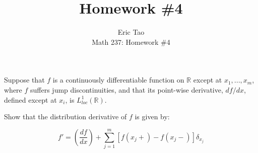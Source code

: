 \documentclass[10pt]{article}
\newenvironment{problem}[2][]{\begin{trivlist}
\item[\hskip \labelsep {\bfseries #1}\hskip \labelsep {\bfseries #2.}]}{\end{trivlist}}
\begin{document}
 
\title{Homework \#4}
\author{Eric Tao\\
Math 237: Homework \#4}
\maketitle

\begin{problem}{Question 2}

Suppose that $f$ is a continuously differentiable function on $\mathbb{R}$ except at $x_1,...,x_m$, where $f$ suffers jump discontinuities, and that its point-wise derivative, $d f/ d x$, defined except at $x_i$, is $L^1_{loc}(\mathbb{R})$.

Show that the distribution derivative of $f$ is given by:

$$ f' = \left( \frac{d f}{dx} \right) + \sum_{j=1}^m [ f(x_j+) - f(x_j-)] \delta_{x_j} $$

\end{problem}
\end{document}
